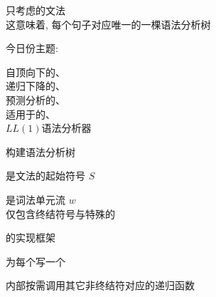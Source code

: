 
\begin{frame}{}
  \begin{center}
    只考虑的文法 \\[4pt]
    这意味着, 每个句子对应唯一的一棵语法分析树


    今日份主题: 
  \end{center}
\end{frame}

\begin{frame}{}
  \begin{center}
    自顶向下的、\\[15pt]
    递归下降的、\\[15pt]
    预测分析的、\\[15pt]
    适用于的、\\[15pt]
    $LL(1)$语法分析器
  \end{center}
\end{frame}

\begin{frame}{}
  \begin{center}
    {\large {}构建语法分析树}

    \vspace{0.60cm}
    是文法的起始符号 $S$


    \vspace{0.80cm}
    是词法单元流 $w$ \\[8pt]
    仅包含终结符号与特殊的
  \end{center}
\end{frame}

\begin{frame}{}
  \begin{center}
    {\large {}的实现框架}


    为每个写一个

    \vspace{0.20cm}
    内部按需调用其它非终结符对应的递归函数
  \end{center}
\end{frame}

